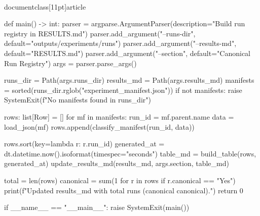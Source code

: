 \\documentclass[11pt]{article}
\begin{document}
\begin{CodeBlock}
def main() -> int:
    parser = argparse.ArgumentParser(description="Build run registry in RESULTS.md")
    parser.add_argument("--runs-dir", default="outputs/experiments/runs")
    parser.add_argument("--results-md", default="RESULTS.md")
    parser.add_argument("--section", default="Canonical Run Registry")
    args = parser.parse_args()

    runs_dir = Path(args.runs_dir)
    results_md = Path(args.results_md)
    manifests = sorted(runs_dir.rglob("experiment_manifest.json"))
    if not manifests:
        raise SystemExit(f"No manifests found in {runs_dir}")

    rows: list[Row] = []
    for mf in manifests:
        run_id = mf.parent.name
        data = load_json(mf)
        rows.append(classify_manifest(run_id, data))

    rows.sort(key=lambda r: r.run_id)
    generated_at = dt.datetime.now().isoformat(timespec="seconds")
    table_md = build_table(rows, generated_at)
    update_results_md(results_md, args.section, table_md)

    total = len(rows)
    canonical = sum(1 for r in rows if r.canonical == "Yes")
    print(f"Updated {results_md} with {total} runs ({canonical} canonical).")
    return 0


if __name__ == "__main__":
    raise SystemExit(main())

\end{CodeBlock}
\end{document}
